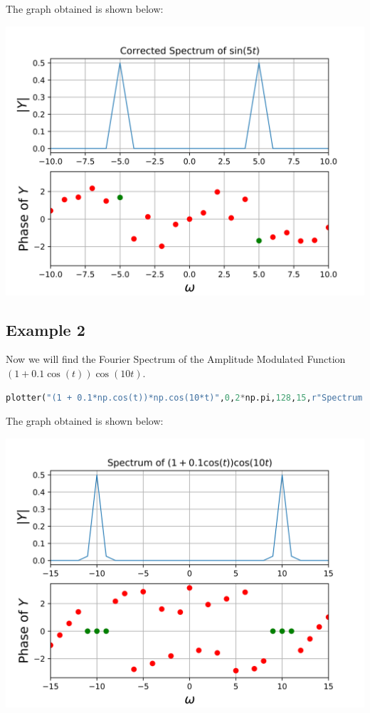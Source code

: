\documentclass[12pt]{article}
\begin{document}
The graph obtained is shown below:
\begin{center}
    \includegraphics[scale=0.7]{images/fig1.png}
\end{center}

\subsection{Example 2}
Now we will find the Fourier Spectrum of the Amplitude Modulated Function $(1+0.1\cos(t))\cos(10t)$.

\begin{lstlisting}[language=Python]
plotter("(1 + 0.1*np.cos(t))*np.cos(10*t)",0,2*np.pi,128,15,r"Spectrum of $\left(1+0.1\cos\left(t\right)\right)\cos\left(10t\right)$",save=True,fignum=2)
\end{lstlisting}

The graph obtained is shown below:
\begin{center}
    \includegraphics[scale=0.7]{images/fig2.png}
\end{center}
\end{document}
